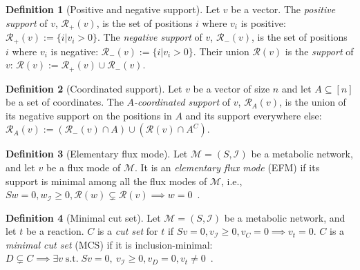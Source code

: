 \documentclass{bioinfo}
\theoremstyle{plain}
\theoremstyle{definition}
\newtheorem{definition}{Definition} %
\begin{document}
\begin{definition} [Positive and negative support]
Let $v$ be a vector. The \emph{positive support} of $v$, $\mathcal{R}_{+}(v)$, is the set of positions $i$ where $v_i$ is positive: $\mathcal{R}_{+}(v) := \{i | v_i > 0\}$. The \emph{negative support} of $v$, $\mathcal{R}_{-}(v)$, is the set of positions $i$ where $v_i$ is negative: $\mathcal{R}_{-}(v) := \{i | v_i > 0\}$. Their union $\mathcal{R}(v)$ is the \emph{support} of $v$: $\mathcal{R}(v) := \mathcal{R}_{+}(v) \cup \mathcal{R}_{-}(v)$.
\end{definition}

\begin{definition} [Coordinated support] Let $v$ be a vector of size $n$ and let $A \subseteq [n]$ be a set of coordinates. The \emph{$A$-coordinated support} of $v$, $\mathcal{R}_A(v)$, is the union of its negative support on the positions in $A$ and its support everywhere else: $\mathcal{R}_A(v) := (\mathcal{R}_-(v) \cap A) \cup (\mathcal{R}(v) \cap A^C)$.

\end{definition}

\begin{definition} [Elementary flux mode]
Let $\mathcal{M} = (S, \mathcal{I})$ be a metabolic network, and let $v$ be a flux mode of $\mathcal{M}$. It is an \emph{elementary flux mode} (EFM) if its support is minimal among all the flux modes of $\mathcal{M}$, i.e., $Sw = 0, {w_\mathcal{I}} \geq 0, \mathcal{R}(w) \subsetneq \mathcal{R}(v) \implies w = 0$~\cite{EFM, Gagneur}.
\end{definition}

\begin{definition} [Minimal cut set]
Let $\mathcal{M} = (S, \mathcal{I})$ be a metabolic network, and let $t$ be a reaction. $C$ is a \emph{cut set} for $t$ if $Sv = 0, {v_\mathcal{I}} \geq 0, v_{C} = 0 \implies v_t = 0$. $C$ is a \emph{minimal cut set} (MCS) if it is inclusion-minimal: $D \subsetneq C \implies \exists v \; \text{s.t.} \; Sv = 0, ~ {v_\mathcal{I}} \geq 0, v_{D} = 0, v_t \neq 0$~\cite{MCS}.
\end{definition}
\end{document}
